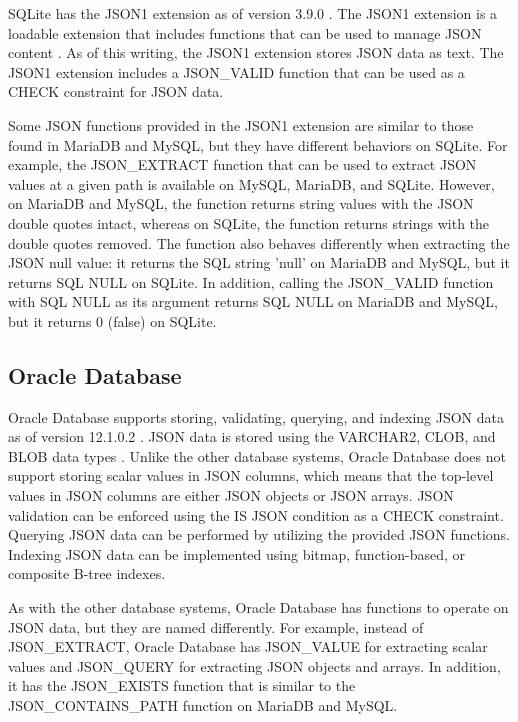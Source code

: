 SQLite has the JSON1 extension as of version 3.9.0 \cite{sqlite:3.9.0}. The
JSON1 extension is a loadable extension that includes functions that can be
used to manage JSON content \cite{sqlite:json1}. As of this writing, the JSON1
extension stores JSON data as text. The JSON1 extension includes a JSON\_VALID
function that can be used as a CHECK constraint for JSON data.

Some JSON functions provided in the JSON1 extension are similar to those found
in MariaDB and MySQL, but they have different behaviors on SQLite. For example,
the JSON\_EXTRACT function that can be used to extract JSON values at a given
path is available on MySQL, MariaDB, and SQLite. However, on MariaDB and MySQL,
the function returns string values with the JSON double quotes intact, whereas
on SQLite, the function returns strings with the double quotes removed. The
function also behaves differently when extracting the JSON null value: it
returns the SQL string 'null' on MariaDB and MySQL, but it returns SQL NULL on
SQLite. In addition, calling the JSON\_VALID function with SQL NULL as its
argument returns SQL NULL on MariaDB and MySQL, but it returns 0 (false) on
SQLite.

\subsection{Oracle Database}

Oracle Database supports storing, validating, querying, and indexing JSON data
as of version 12.1.0.2 \cite{oracle:12.1.0.2}. JSON data is stored using the
VARCHAR2, CLOB, and BLOB data types \cite{oracle:json}. Unlike the other
database systems, Oracle Database does not support storing scalar values in
JSON columns, which means that the top-level values in JSON columns are either
JSON objects or JSON arrays. JSON validation can be enforced using the IS JSON
condition as a CHECK constraint. Querying JSON data can be performed by
utilizing the provided JSON functions. Indexing JSON data can be implemented
using bitmap, function-based, or composite B-tree indexes.

As with the other database systems, Oracle Database has functions to operate
on JSON data, but they are named differently. For example, instead of
JSON\_EXTRACT, Oracle Database has JSON\_VALUE for extracting scalar values and
JSON\_QUERY for extracting JSON objects and arrays. In addition, it has the
JSON\_EXISTS function that is similar to the JSON\_CONTAINS\_PATH function on
MariaDB and MySQL.


